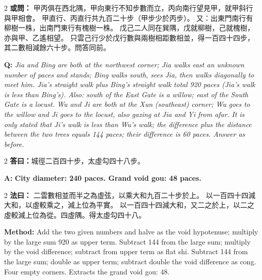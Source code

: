 \documentclass[11pt,a4paper]{article}
\newcommand{\owen}[1]{%
  \noindent\textcolor{problemcolor}{\textbf{或問：}}{\tradfont #1}\par\nopagebreak%
}
\newcommand{\oweneng}[1]{%
  \noindent\textcolor{engcolor}{\textbf{Q: }}{\itshape #1}\par\nopagebreak%
}
\newcommand{\fayue}[1]{%
  \noindent\textcolor{methodcolor}{\textbf{法曰：}}{\tradfont #1}\par\nopagebreak%
}
\newcommand{\fayueeng}[1]{%
  \noindent\textcolor{engcolor}{\textbf{Method: }}{#1}\par\nopagebreak%
}
\newcommand{\dayue}[1]{%
  \noindent\textcolor{anscolor}{\textbf{答曰：}}{\tradfont #1}\par\nopagebreak%
}
\newcommand{\dayueeng}[1]{%
  \noindent\textcolor{engcolor}{\textbf{A: }}{\bfseries #1}\par\nopagebreak%
}
\begin{document}
\begin{paracol}{2}
\owen{%
甲丙俱在西北隅，甲向東行不知步數而立，丙向南行望見甲，就甲斜行與甲相會。
甲直行、丙直行共九百二十步（甲步少於丙步）。
又：出東門南行有柳樹一株，出南門東行有槐樹一株。
戊己二人同在巽隅，戊就柳樹，己就槐樹，亦與甲、乙遙相望。
只雲己行少於戊行數與兩樹相距數相並，得一百四十四步，其二數相減餘六十步。問答同前。}
\switchcolumn
\oweneng{%
Jia and Bing are both at the northwest corner; Jia walks east an unknown number of paces and stands; Bing walks south, sees Jia, then walks diagonally to meet him. Jia's straight walk plus Bing's straight walk total 920 paces (Jia's walk is less than Bing's). Also: south of the East Gate is a willow; east of the South Gate is a locust. Wu and Ji are both at the Xun (southeast) corner; Wu goes to the willow and Ji goes to the locust, also gazing at Jia and Yi from afar. It is only stated that Ji's walk is less than Wu's walk; the difference plus the distance between the two trees equals 144 paces; their difference is 60 paces. Answer as before.}
\end{paracol}

\begin{paracol}{2}
\dayue{城徑二百四十步，太虛勾四十八步。}
\switchcolumn
\dayueeng{City diameter: 240 paces. Grand void gou: 48 paces.}
\end{paracol}

\begin{paracol}{2}
\fayue{%
二雲數相並而半之為虛弦，以乘大和九百二十步於上。
以一百四十四減大和，以虛較乘之，減上位為平實。
以一百四十四減大和，又二之於上，以二之虛較減上位為從。四虛隅。得太虛勾四十八。}
\switchcolumn
\fayueeng{%
Add the two given numbers and halve as the void hypotenuse; multiply by the large sum 920 as upper term. Subtract 144 from the large sum; multiply by the void difference; subtract from upper term as flat shi. Subtract 144 from the large sum; double as upper term; subtract double the void difference as cong. Four empty corners. Extracts the grand void gou: 48.}
\end{paracol}
\end{document}
